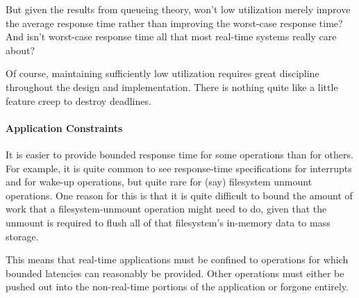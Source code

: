 \QuickQuiz{}
	But given the results from queueing theory, won't low utilization
	merely improve the average response time rather than improving
	the worst-case response time?
	And isn't worst-case response time all that most
	real-time systems really care about?
 \QuickQuizEnd

Of course, maintaining sufficiently low utilization requires great
discipline throughout the design and implementation.
There is nothing quite like a little feature creep to destroy deadlines.

\paragraph{Application Constraints}
\label{sec:advsync:Application Constraints}

It is easier to provide bounded response time for some operations than
for others.
For example, it is quite common to see response-time specifications for
interrupts and for wake-up operations, but quite rare for (say)
filesystem unmount operations.
One reason for this is that it is quite difficult to bound the amount
of work that a filesystem-unmount operation might need to do, given that
the unmount is required to flush all of that filesystem's in-memory
data to mass storage.

This means that real-time applications must be confined to operations
for which bounded latencies can reasonably be provided.
Other operations must either be pushed out into the non-real-time portions
of the application or forgone entirely.

